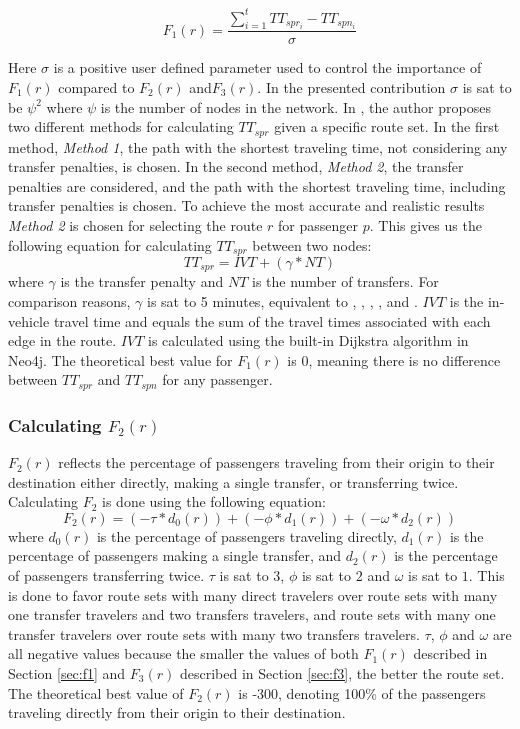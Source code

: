 $$F_{1}(r) = \frac{\sum\limits^{t}_{i=1}TT_{spr_i}-TT_{spn_i}}{\sigma}$$

Here $\sigma$ is a positive user defined parameter used to control the importance of $F_{1}(r)$ compared to $F_{2}(r)$ and$F_{3}(r)$. In the presented contribution $\sigma$ is sat to be $\psi^2$ where $\psi$ is the number of nodes in the network. In \citet{mandl79}, the author proposes two different methods for calculating $TT_{spr}$ given a specific route set. In the first method, \textit{Method 1}, the path with the shortest traveling time, not considering any transfer penalties, is chosen. In the second method, \textit{Method 2}, the transfer penalties are considered, and the path with the shortest traveling time, including transfer penalties is chosen. To achieve the most accurate and realistic results \textit{Method 2} is chosen for selecting the route $r$ for passenger $p$. This gives us the following equation for calculating $TT_{spr}$ between two nodes: 
\newline
$$TT_{spr} = IVT + (\gamma*NT)$$
\newline
where $\gamma$ is the transfer penalty and $NT$ is the number of transfers. For comparison reasons, $\gamma$ is sat to 5 minutes, equivalent to \citet{kechagiopoulos14}, \citet{baaj91}, \citet{chakroborty02}, \citet{nikolic14}, \citet{fan10} and \citet{mandl79}. $IVT$ is the in-vehicle travel time and equals the sum of the travel times associated with each edge in the route. $IVT$ is calculated using the built-in Dijkstra algorithm in Neo4j. The theoretical best value for $F_{1}(r)$ is 0, meaning there is no difference between $TT_{spr}$ and $TT_{spn}$ for any passenger.

\subsubsection{Calculating $F_{2}(r)$}
\label{sec:f2}
$F_{2}(r)$ reflects the percentage of passengers traveling from their origin to their destination either directly, making a single transfer, or transferring twice. Calculating $F_{2}$ is done using the following equation: 
\newline
$$F_2(r) = (-\tau*d_0(r)) + (-\phi*d_1(r)) + (-\omega*d_2(r))$$
\newline
where $d_0(r)$ is the percentage of passengers traveling directly, $d_1(r)$ is the percentage of passengers making a single transfer, and $d_2(r)$ is the percentage of passengers transferring twice. $\tau$ is sat to $3$, $\phi$ is sat to $2$ and $\omega$ is sat to $1$. This is done to favor route sets with many direct travelers over route sets with many one transfer travelers and two transfers travelers, and route sets with many one transfer travelers over route sets with many two transfers travelers. $\tau$, $\phi$ and $\omega$ are all negative values because the smaller the values of both $F_{1}(r)$ described in Section \vref{sec:f1} and $F_{3}(r)$ described in Section \vref{sec:f3}, the better the route set. The theoretical best value of $F_{2}(r)$ is -300, denoting 100\% of the passengers traveling directly from their origin to their destination. 

